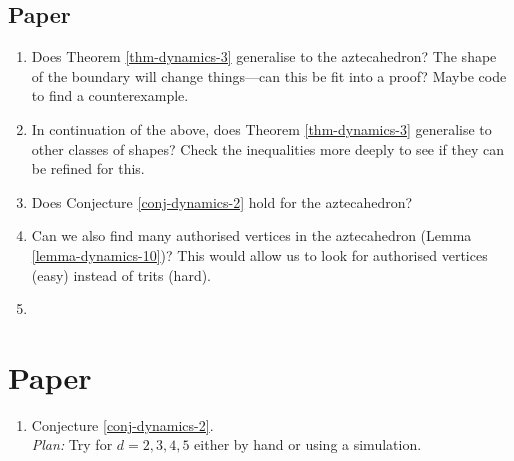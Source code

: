 \subsection{Paper \cite{hartarsky2023local}}
\begin{enumerate}
	\item Does Theorem \ref{thm-dynamics-3} generalise to the aztecahedron? The shape of the boundary will change things---can this be fit into a proof? Maybe code to find a counterexample.
	\item In continuation of the above, does Theorem \ref{thm-dynamics-3} generalise to other classes of shapes? Check the inequalities more deeply to see if they can be refined for this.
	\item Does Conjecture \ref{conj-dynamics-2} hold for the aztecahedron?
	\item Can we also find many authorised vertices in the aztecahedron (Lemma \ref{lemma-dynamics-10})? This would allow us to look for authorised vertices (easy) instead of trits (hard). 
	\item 
\end{enumerate}

\section{Paper \cite{hartarsky2023local}}
\begin{enumerate}
	\item Conjecture \ref{conj-dynamics-2}.\\ \textit{Plan:} Try for $d = 2,3,4,5$ either by hand or using a simulation.
\end{enumerate}
